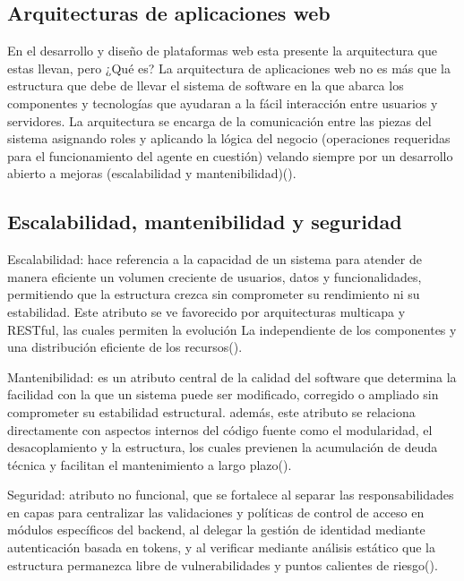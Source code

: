 \subsection{Arquitecturas de aplicaciones web}
\label{subsec:desarrollo_web}

En el desarrollo y diseño de plataformas web esta presente la arquitectura que estas llevan, pero ¿Qué es?
La arquitectura de aplicaciones web no es más que la estructura que debe de llevar el sistema de software en la que abarca los componentes y tecnologías que ayudaran a la fácil interacción entre usuarios y servidores.
La arquitectura se encarga de la comunicación entre las piezas del sistema asignando roles y aplicando la lógica del negocio (operaciones requeridas para el funcionamiento del agente en cuestión) velando siempre por un desarrollo abierto a mejoras (escalabilidad y mantenibilidad)(\cite{guachamin2024desarrollo}).


\subsection{Escalabilidad, mantenibilidad y seguridad}
Escalabilidad: hace referencia a la capacidad de un sistema para atender de manera eficiente un volumen creciente de usuarios, datos y funcionalidades, permitiendo que la estructura crezca sin comprometer su rendimiento ni su estabilidad. Este atributo se ve favorecido por arquitecturas multicapa y RESTful, las cuales permiten la evolución La independiente de los componentes y una distribución eficiente de los recursos(\cite{clavijo2026aplicacion}).


Mantenibilidad: es un atributo central de la calidad del software que determina la facilidad con la que un sistema puede ser modificado, corregido o ampliado sin comprometer su estabilidad estructural.
además, este atributo se relaciona directamente con aspectos internos del código fuente como el modularidad, el desacoplamiento y la estructura, los cuales previenen la acumulación de deuda técnica y facilitan el mantenimiento a largo plazo(\cite{clavijo2026aplicacion}).


Seguridad: atributo no funcional, que se fortalece al separar las responsabilidades en capas para centralizar las validaciones y políticas de control de acceso en módulos específicos del backend, al delegar la gestión de identidad mediante autenticación basada en tokens, y al verificar mediante análisis estático que la estructura permanezca libre de vulnerabilidades y puntos calientes de riesgo(\cite{clavijo2026aplicacion}).

